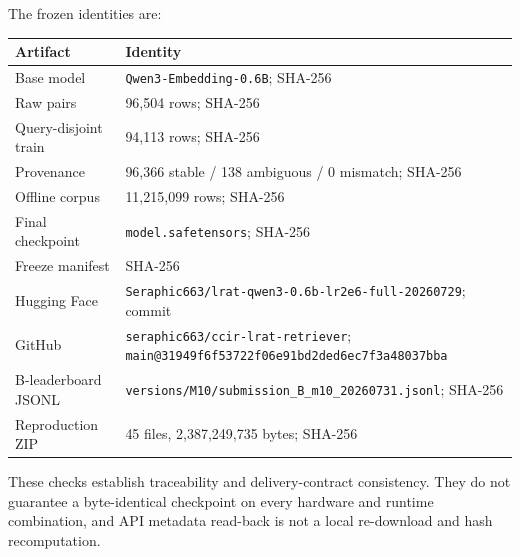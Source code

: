 \documentclass[10pt,a4paper]{article}
\begin{document}
The frozen identities are:

\begin{center}
\scriptsize
\begin{tabularx}{0.97\textwidth}{p{}Y}
\toprule
Artifact & Identity \\
\midrule
Base model & \texttt{Qwen3-Embedding-0.6B}; SHA-256  \\
Raw pairs & 96,504 rows; SHA-256  \\
Query-disjoint train & 94,113 rows; SHA-256  \\
Provenance & 96,366 stable / 138 ambiguous / 0 mismatch; SHA-256  \\
Offline corpus & 11,215,099 rows; SHA-256  \\
Final checkpoint & \texttt{model.safetensors}; SHA-256  \\
Freeze manifest & SHA-256  \\
Hugging Face & \texttt{Seraphic663/lrat-qwen3-0.6b-lr2e6-full-20260729}; commit  \\
GitHub & \texttt{seraphic663/ccir-lrat-retriever}; \texttt{main@31949f6f53722f06e91bd2ded6ec7f3a48037bba} \\
B-leaderboard JSONL & \texttt{versions/M10/submission\_B\_m10\_20260731.jsonl}; SHA-256  \\
Reproduction ZIP & 45 files, 2,387,249,735 bytes; SHA-256  \\
\bottomrule
\end{tabularx}
\end{center}

These checks establish traceability and delivery-contract consistency. They do not guarantee a byte-identical checkpoint on every hardware and runtime combination, and API metadata read-back is not a local re-download and hash recomputation.
\end{document}
